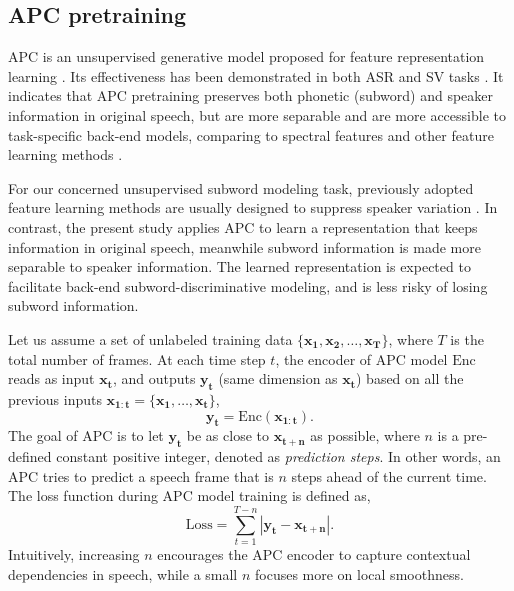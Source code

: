 \documentclass[a4paper]{article}
\begin{document}
\subsection{APC pretraining}
APC is an unsupervised generative model proposed for feature representation learning \cite{Chung2019}. 
Its effectiveness has been demonstrated in both ASR and SV tasks \cite{Chung2019}. It indicates that APC pretraining preserves both phonetic (subword) and speaker information in original speech,  but are more  separable and are more accessible to task-specific back-end models, comparing to spectral features and other feature learning methods \cite{Chung2019}. 

For our concerned unsupervised subword modeling task, previously adopted feature learning methods 
are usually designed to suppress speaker variation \cite{Feng2019improving,heck2017feature}. In contrast, the present study applies APC to learn a representation that keeps information in original speech, meanwhile subword information is made more separable to speaker information. The learned representation is expected to facilitate back-end subword-discriminative modeling, and is less risky of losing subword information.



Let us assume a set of unlabeled training data $\{\bm{x_1}, \bm{x_2}, \ldots, \bm{x_T}\}$, where $T$ is the total number of frames. At each time step $t$, the encoder of APC model $\textrm{Enc}$ reads as input
$\bm{x_t}$, 
and outputs $\bm{y_t}$ (same dimension as $\bm{x_t}$) based on all the previous inputs $\bm{x_{1:t}}=\{\bm{x_1},\ldots,\bm{x_t}\}$,
\begin{equation}
    \bm{y_t} = \textrm{Enc} (\bm{x_{1:t}}).
    \label{eqt:enc}
\end{equation}
The goal of APC is to let $\bm{y_t}$ be as close to $\bm{x_{t+n}}$ as possible, where $n$ is a pre-defined constant positive integer, denoted as \textit{prediction steps}. In other words, an APC tries to predict a speech frame that is $n$ steps ahead of the current time. The loss function during APC model training is defined as,
\begin{equation}
    \textrm{Loss} = \sum_{t=1}^{T-n} \left| \bm{y_t} - \bm{x_{t+n}} \right|.
    \label{eqt:apc_loss}
\end{equation}
Intuitively, increasing $n$ encourages the APC encoder to capture contextual dependencies in speech, 
while a small $n$ focuses more on local smoothness.
 
\end{document}
